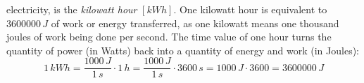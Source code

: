 electricity, is the \emph{kilowatt hour} $[kWh]$. One kilowatt hour is equivalent to $3 600 000\, J$ of work or energy transferred, as one kilowatt means one thousand joules of work being done per second. The time value of one hour turns the quantity of power (in Watts) back into a quantity of energy and work (in Joules): $$1\, kWh = \frac{1000\, J}{1\, s} \cdot 1\, h = \frac{1000\, J}{1\, s} \cdot 3600\, s = 1000\, J \cdot 3600 = 3 600 000\, J$$

